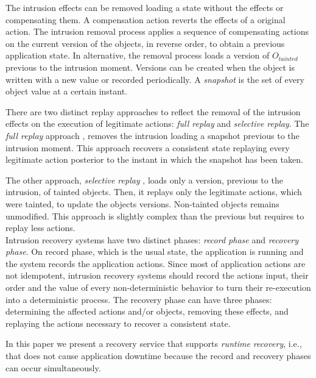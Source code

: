 The intrusion effects can be removed loading a state without the effects or compensating them. A compensation action reverts the effects of a original action. The intrusion removal process applies a sequence of compensating actions on the current version of the objects, in reverse order, to obtain a previous application state. In alternative, the removal process loads a version of $O_{tainted}$ previous to the intrusion moment. Versions can be created when the object is written with a new value or recorded periodically. A \emph{snapshot} is the set of every object value at a certain instant.

There are two distinct replay approaches to reflect the removal of the intrusion effects on the execution of legitimate actions: \emph{full replay} and \emph{selective replay}. The \textit{full replay} approach \cite{undoForOperators}, removes the intrusion loading a snapshot previous to the intrusion moment. This approach recovers a consistent state replaying every legitimate action posterior to the instant in which the snapshot has been taken. 

The other approach, \textit{selective replay} \cite{taser,warp,goel}, loads only a version, previous to the intrusion, of tainted objects. Then, it replays only the legitimate actions, which were tainted, to update the objects versions. Non-tainted objects remains unmodified. This approach is slightly complex than the previous but requires to replay less actions.\\

Intrusion recovery systems have two distinct phases: \textit{record phase} and \textit{recovery phase}. On record phase, which is the usual state, the application is running and the system records the application actions. Since most of application actions are not idempotent, intrusion recovery systems should record the actions input, their order and the value of every non-deterministic behavior to turn their re-execution into a deterministic process. %
The recovery phase can have three phases: determining the affected actions and/or objects, removing these effects, and replaying the actions necessary to recover a consistent state. 

In this paper we present a recovery service that supports \textit{runtime recovery}, i.e., that does not cause application downtime because the record and recovery phases can occur simultaneously.\\

